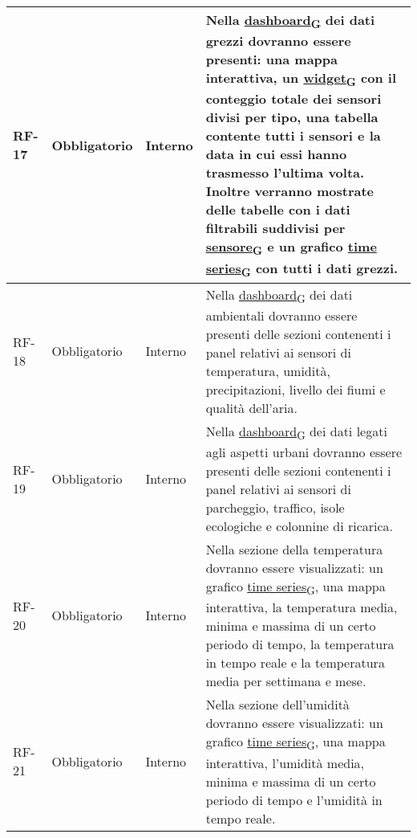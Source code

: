 \begin{longtable}{|>{\centering\arraybackslash}m{}|>{\centering\arraybackslash}m{}|>{\centering\arraybackslash}m{}|>{\centering\arraybackslash}m{}|}
	RF-17           & Obbligatorio        & Interno                                                                                                           & Nella \href{https://7last.github.io/docs/rtb/documentazione-interna/glossario\#dashboard}{dashboard\textsubscript{G}} dei dati grezzi dovranno essere presenti: una mappa interattiva, un \href{https://7last.github.io/docs/rtb/documentazione-interna/glossario\#widget}{widget\textsubscript{G}} con il conteggio totale dei sensori divisi per tipo, una tabella contente tutti i sensori e la data in cui essi hanno trasmesso l'ultima volta. Inoltre verranno mostrate delle tabelle con i dati filtrabili suddivisi per \href{https://7last.github.io/docs/rtb/documentazione-interna/glossario\#sensore}{sensore\textsubscript{G}} e un grafico \href{https://7last.github.io/docs/rtb/documentazione-interna/glossario\#time-series}{time series\textsubscript{G}} con tutti i dati grezzi.
	\\\hline
	RF-18           & Obbligatorio        & Interno                                                                                                           & Nella \href{https://7last.github.io/docs/rtb/documentazione-interna/glossario\#dashboard}{dashboard\textsubscript{G}} dei dati ambientali dovranno essere presenti delle sezioni contenenti i panel relativi ai sensori di temperatura, umidità, precipitazioni, livello dei fiumi e qualità dell'aria.
	\\\hline
	RF-19           & Obbligatorio        & Interno                                                                                                           & Nella \href{https://7last.github.io/docs/rtb/documentazione-interna/glossario\#dashboard}{dashboard\textsubscript{G}} dei dati legati agli aspetti urbani dovranno essere presenti delle sezioni contenenti i panel relativi ai sensori di parcheggio, traffico, isole ecologiche e colonnine di ricarica.
	\\\hline
	RF-20           & Obbligatorio        & Interno                                                                                                           & Nella sezione della temperatura dovranno essere visualizzati: un grafico \href{https://7last.github.io/docs/rtb/documentazione-interna/glossario\#time-series}{time series\textsubscript{G}}, una mappa interattiva, la temperatura media, minima e massima di un certo periodo di tempo, la temperatura in tempo reale e la temperatura media per settimana e mese.
	\\\hline
	RF-21           & Obbligatorio        & Interno                                                                                                           & Nella sezione dell'umidità dovranno essere visualizzati: un grafico \href{https://7last.github.io/docs/rtb/documentazione-interna/glossario\#time-series}{time series\textsubscript{G}}, una mappa interattiva, l'umidità media, minima e massima di un certo periodo di tempo e l'umidità in tempo reale.

\end{longtable}
